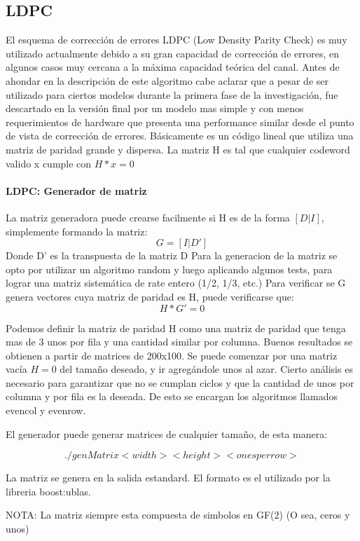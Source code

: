 \subsection{LDPC}
El esquema de corrección de errores LDPC (Low Density Parity Check) es muy utilizado actualmente debido a su gran capacidad de corrección de errores, en algunos casos muy cercana a la máxima capacidad teórica del canal.
Antes de ahondar en la descripción de este algoritmo cabe aclarar que a pesar de ser utilizado para ciertos modelos durante la primera fase de la investigación, fue descartado en la versión final por un modelo mas simple y con menos requerimientos de hardware que presenta una performance similar desde el punto de vista de corrección de errores.
Básicamente es un código lineal que utiliza una matriz de paridad grande y dispersa.
La matriz H es tal que cualquier codeword valido x cumple con $H*x=0$

\paragraph{LDPC: Generador de matriz}
La matriz generadora puede crearse facilmente si H es de la forma $[D|I]$, simplemente formando la matriz:
$$G=[I|D']$$
Donde D' es la transpuesta de la matriz D
Para la generacion de la matriz se opto por utilizar un algoritmo random y luego aplicando algunos tests, para lograr una matriz sistemática de rate entero (1/2, 1/3, etc.)
Para verificar se G genera vectores cuya matriz de paridad es H, puede verificarse que:
$$ H*G'=0 $$

Podemos definir la matriz de paridad H como una matriz de paridad que tenga mas de 3 unos por fila y una cantidad similar por columna. Buenos resultados se obtienen a partir de matrices de 200x100.
Se puede comenzar por una matriz vacía $H = 0$ del tamaño deseado, y ir agregándole unos al azar. Cierto análisis es necesario para garantizar que no se cumplan ciclos y que la cantidad de unos por columna y por fila es la deseada. De esto se encargan los algoritmos llamados evencol y evenrow.

El generador puede generar matrices de cualquier tamaño, de esta manera:

$$ ./genMatrix <width> <height> <ones per row>$$

La matriz se genera en la salida estandard. El formato es el utilizado por la libreria boost:ublas.

NOTA: La matriz siempre esta compuesta de simbolos en GF(2) (O sea, ceros y unos)

